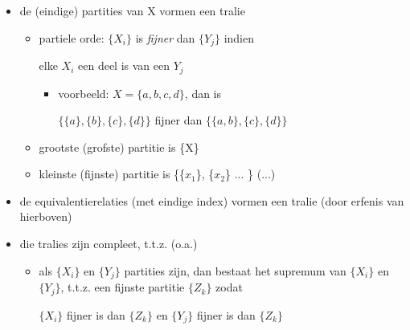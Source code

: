 \documentclass{seminar}
\newcommand{\openpagina}{}
\begin{document}
\begin{slide}

\begin{itemize}
\item 
de (eindige) partities van X vormen een tralie
\begin{itemize}
\item 
partiele orde: $\{X_i\}$ is {\em fijner} dan $\{Y_j\}$ indien

elke $X_i$ een deel is van een $Y_j$
\begin{itemize}
\item[] voorbeeld: $X = \{a,b,c,d\}$, dan is

$\{\{a\},\{b\},\{c\},\{d\}\}$ fijner dan $\{\{a,b\},\{c\},\{d\}\}$

\end{itemize}

\item 
grootste (grofste) partitie is \{X\}
\item 
kleinste (fijnste) partitie is \{\{$x_1$\}, \{$x_2$\} ... \} (...)
\end{itemize}

\item 

de equivalentierelaties (met eindige index) vormen een tralie (door
erfenis van hierboven)

\item 
die tralies zijn compleet, t.t.z. (o.a.)
\begin{itemize}
\item 
als $\{X_i\}$ en $\{Y_j\}$ partities zijn, dan bestaat het supremum van
$\{X_i\}$ en $\{Y_j\}$, t.t.z. een fijnste partitie $\{Z_k\}$ zodat

$\{X_i\}$ fijner is dan $\{Z_k\}$ en $\{Y_j\}$ fijner is dan $\{Z_k\}$

\end{itemize}


\end{itemize}

\end{slide} \openpagina
\end{document}
